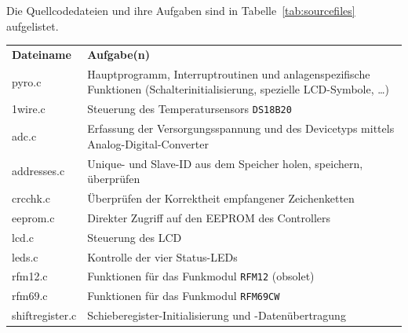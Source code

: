 \documentclass[pdftex, parskip, numbers=noenddot, toc=listof]{scrbook}
\begin{document}
	Die Quellcodedateien und ihre Aufgaben sind in Tabelle~\ref{tab:sourcefiles} aufgelistet.

	\begin{table}[h]
		\begin{tabular}{lp{125mm}}
			\hline \textbf{Dateiname} & \textbf{Aufgabe(n)}                                                                                                        \\
			pyro.c                    & Hauptprogramm, Interruptroutinen und anlagenspezifische Funktionen (Schalterinitialisierung, spezielle LCD-Symbole, \dots) \\
			1wire.c                   & Steuerung des Temperatursensors \texttt{DS18B20}                                                                           \\
			adc.c                     & Erfassung der Versorgungsspannung und des Devicetyps mittels Analog-Digital-Converter                                      \\
			addresses.c               & Unique- und Slave-ID aus dem Speicher holen, speichern, überprüfen                                                       \\
			crcchk.c                  & Überprüfen der Korrektheit empfangener Zeichenketten                                                                     \\
			eeprom.c                  & Direkter Zugriff auf den EEPROM des Controllers                                                                            \\
			lcd.c                     & Steuerung des LCD                                                                                                          \\
			leds.c                    & Kontrolle der vier Status-LEDs                                                                                             \\
			rfm12.c                   & Funktionen für das Funkmodul \texttt{RFM12} (obsolet)                                                                     \\
			rfm69.c                   & Funktionen für das Funkmodul \texttt{RFM69CW}                                                                             \\
			shiftregister.c           & Schieberegister-Initialisierung und -Datenübertragung                                                                     \\

\end{tabular}
\end{table}
\end{document}
